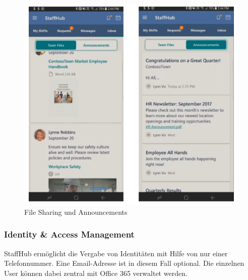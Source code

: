 \begin{figure}[H] 
\centering 
\includegraphics[scale=0.78]{images/communication} 
\caption[File Sharing und Announcements]{File Sharing und Announcements\protect} 
\label{ws} 
\end{figure}

\subsubsection{Identity \& Access Management}

StaffHub ermöglicht die Vergabe von Identitäten mit Hilfe von nur einer Telefonnummer. Eine Email-Adresse ist in diesem Fall optional. Die einzelnen User können dabei zentral mit Office 365 verwaltet werden.

